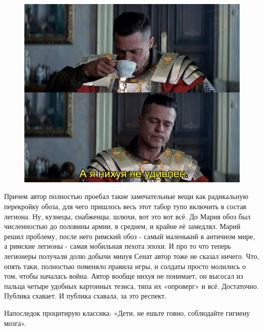 \begin{figure}[h!tb] 
	\centering\includegraphics[scale=0.6]{Mariy/1593599741150795821.png}
\end{figure}

Причем автор полностью проебал такие замечательные вещи как радикальную перекройку обоза, для чего пришлось весь этот табор тупо включить в состав легиона. Ну, кузнецы, снабженцы, шлюхи, вот это вот всё. До Мария обоз был численностью до половины армии, в среднем, и крайне её замедлял. Марий решил проблему, после него римский обоз - самый маленький в античном мире, а римские легионы - самая мобильная пехота эпохи. И про то что теперь легионеры получали долю добычи минуя Сенат автор тоже не сказал ничего. Что, опять таки, полностью поменяло правила игры, и солдаты просто молились о том, чтобы началась война. Автор вообще нихуя не понимает, он высосал из пальца четыре удобных картонных тезиса, типа их «опроверг» и всё. Достаточно. Публика схавает. И публика схавала, за это респект.


Напоследок процитирую классика: «Дети, не ешьте говно, соблюдайте гигиену мозга».